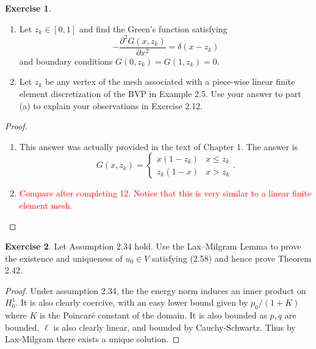\documentclass{amsart}
\theoremstyle{plain}
\theoremstyle{definition}
\newtheorem{exer}{Exercise}[section]
\newcommand{\tcr}[1]{\textcolor{red}{#1}}
\begin{document}
\begin{exer}
    \begin{enumerate}[label=\alph*.]
        \item Let $z_k \in [0,1]$ and find the Green's function satisfying 
        $$-\frac{\partial^2 G(x,z_k)}{\partial x^2 } = \delta(x-z_k)$$
        and boundary conditions $G(0,z_k) = G(1,z_k) = 0.$
        \item Let $z_k$ be any vertex of the mesh associated with a piece-wise linear finite element discretization of the BVP in Example 2.5. Use your answer to part (a) to explain your observations in Exercise 2.12.
    \end{enumerate}
\end{exer}
\begin{proof}
    \begin{enumerate}[label=\alph*.]
        \item This answer was actually provided in the text of Chapter 1. The answer is 
        $$G(x,z_k) = \begin{cases}
            x(1-z_k)& x \leq z_k \\
            z_k(1-x)& x > z_k 
        \end{cases}.$$
        \item \tcr{Compare after completing 12. Notice that this is very similar to a linear finite element mesh.}
\end{enumerate}
\end{proof}
\begin{exer}
    Let Assumption 2.34 hold. Use the Lax–Milgram Lemma to prove the existence and uniqueness of $u_0 \in V$ satisfying (2.58) and hence prove Theorem 2.42.
\end{exer}
\begin{proof}
    Under assumption 2.34, the the energy norm induces an inner product on $H_0^1.$ It is also clearly coercive, with an easy lower bound given by $p_0/(1+K)$ where $K$ is the Poincar\'e constant of the domain. It is also bounded as $p,q$ are bounded. $\ell$ is also clearly linear, and bounded by Cauchy-Schwartz. Thus by Lax-Milgram there exists a unique solution.
\end{proof}
\end{document}
